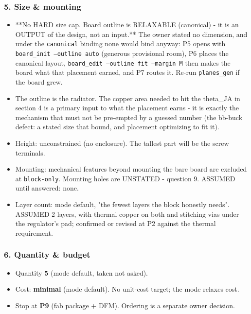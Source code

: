 \documentclass[11pt,a4paper]{article}
\begin{document}
\subsubsection*{5. Size \& mounting}
\begin{itemize}
\item {*}{*}No HARD size cap. Board outline is RELAXABLE (canonical) - it is an OUTPUT
of the design, not an input.{*}{*} The owner stated no dimension, and under the
\texttt{canonical} binding none would bind anyway: P5 opens with
\texttt{board\_init --outline auto} (generous provisional room), P6 places the
canonical layout, \texttt{board\_edit --outline fit --margin M} then makes the board
what that placement earned, and P7 routes it. Re-run \texttt{planes\_gen} if the
board grew.
\item The outline is the radiator. The copper area needed to hit the theta\_JA in
section 4 is a primary input to what the placement earns - it is exactly the
mechanism that must not be pre-empted by a guessed number (the bb-buck
defect: a stated size that bound, and placement optimizing to fit it).
\item Height: unconstrained (no enclosure). The tallest part will be the screw
terminals.
\item Mounting: mechanical features beyond mounting the bare board are excluded at
\texttt{block-only}. Mounting holes are UNSTATED - question 9. ASSUMED until
answered: none.
\item Layer count: mode default, "the fewest layers the block honestly needs".
ASSUMED 2 layers, with thermal copper on both and stitching vias under the
regulator's pad; confirmed or revised at P2 against the thermal requirement.
\end{itemize}
\subsubsection*{6. Quantity \& budget}
\begin{itemize}
\item Quantity \textbf{5} (mode default, taken not asked).
\item Cost: \textbf{minimal} (mode default). No unit-cost target; the mode relaxes cost.
\item Stop at \textbf{P9} (fab package + DFM). Ordering is a separate owner decision.
\end{itemize}
\end{document}
